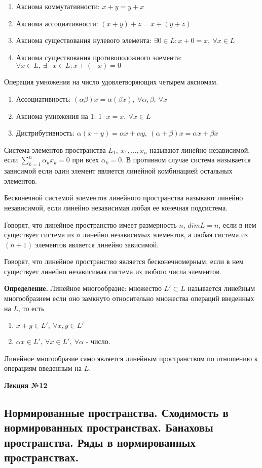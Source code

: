 \documentclass[14pt,a4paper]{extarticle}
\theoremstyle{definition}
\theoremstyle{remark}
\newcommand{\be}{\begin{enumerate}}
\newcommand{\ee}{\end{enumerate}}
\newcommand{\sep}{ , \ \allowbreak }
\renewcommand{\[}{\begin{dmath*}[compact]}
\renewcommand{\]}{\end{dmath*}}
\newcommand{\tdef}{\textbf{Определение.} }
\begin{document}
\be
  \item Аксиома коммутативности: $x+y = y+x$
  \item Аксиома ассоциативности: $(x+y)+z = x+(y+z)$
  \item Аксиома существования нулевого элемента: $\exists 0 \in L: x+0=x \sep \forall x \in L$
  \item Аксиома существования противоположного элемента: $\forall x \in L \sep \exists -x \in L: x+(-x)=0$
\ee

Операция умножения на число удовлетворяющих четырем аксиомам.
\be
  \item Ассоциативность: $(\alpha \beta) x = \alpha (\beta x) \sep \forall \alpha, \beta \sep \forall x$
  \item Аксиома умножения на 1: $1\cdot x = x \sep \forall x \in L$
  \item Дистрибутивность: $\alpha (x+y)=\alpha x + \alpha y \sep (\alpha+\beta)x=\alpha x + \beta x$
\ee

Система элементов пространства $L_1 \sep x_1, \dots, x_n$ называют линейно независимой, если $\sum_{k=1}^n \alpha_k x_k = 0$ при всех $\alpha_k = 0$. В противном случае система называется зависимой если один элемент является линейной комбинацией остальных элементов.

Бесконечной системой элементов линейного пространства называют линейно независимой, если линейно независимая любая ее конечная подсистема.

Говорят, что линейное пространство имеет размерность $n$, $dim L=n$, если в нем существует система из $n$ линейно независимых элементов, а любая система из $(n+1)$ элементов является линейно зависимой.

Говорят, что линейное пространство является бесконечномерным, если в нем существует линейно независимая система из любого числа элементов.

\tdef Линейное многообразие: множество $L'\subset L$ называется линейным многообразием если оно замкнуто относительно множества операций введенных на $L$, то есть
\be
  \item $x+y \in L' \sep \forall x,y \in L'$
  \item $\alpha x \in L' \sep \forall x \in L' \sep \forall \alpha$ - число.
\ee

Линейное многообразие само является линейным пространством по отношению к операциям введенным на $L$.

\textbf{Лекция №12}

\subsection{Нормированные пространства.
Сходимость в нормированных пространствах.
Банаховы пространства. Ряды в нормированных пространствах.}
\end{document}
